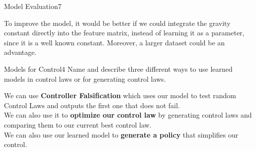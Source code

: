 \begin{questions}
\begin{question}{Model Evaluation}{7}
\begin{answer}
	To improve the model, it would be better if we could integrate the gravity constant directly into the feature matrix, instead of learning it as a parameter, since it is a well known constant. Moreover, a larger dataset could be an advantage.

\end{answer}

\end{question}



\begin{question}[bonus]{Models for Control}{4}
Name and describe three different ways to use learned models in control laws or for generating control laws.

\begin{answer}
We can use \textbf{Controller Falsification} which uses our model to test random Control Laws and outputs the first one that does not fail.\\
We can also use it to \textbf{optimize our control law} by generating control laws and comparing them to our current best control law. \\
We can also use our learned model to \textbf{generate a policy} that simplifies our control.
\end{answer}

\end{question}


\end{questions}
